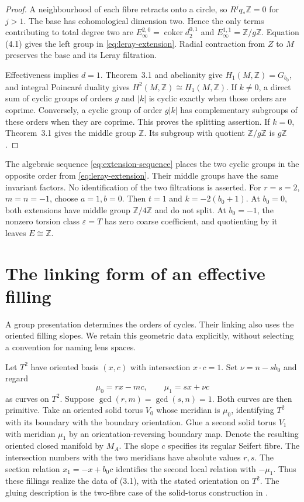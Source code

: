 \begin{proof}
A neighbourhood of each fibre retracts onto a circle, so
$R^jq_*\mathbb Z=0$ for $j>1$.  The base has cohomological dimension
two.  Hence the only terms contributing to total degree two are
$E_\infty^{2,0}=\operatorname{coker}d_2^{0,1}$ and
$E_\infty^{1,1}=\mathbb Z/g\mathbb Z$.  Equation (4.1) gives the
left group in \eqref{eq:leray-extension}.  Radial contraction from $Z$
to $M$ preserves the base and its Leray filtration.

Effectiveness implies $d=1$.  Theorem~3.1 and abelianity give
$H_1(M,\mathbb Z)=G_{b_0}$, and integral Poincar\'e duality gives
$H^2(M,\mathbb Z)\cong H_1(M,\mathbb Z)$.
If $k\ne0$, a direct sum of cyclic groups of orders $g$ and $|k|$ is
cyclic exactly when those orders are coprime.  Conversely, a cyclic group
of order $g|k|$ has complementary subgroups of these orders when they
are coprime.  This proves the splitting assertion.
If $k=0$, Theorem~3.1 gives the middle group $\mathbb Z$.
Its subgroup with quotient $\mathbb Z/g\mathbb Z$ is $g\mathbb Z$.
\end{proof}

The algebraic sequence \eqref{eq:extension-sequence} places the two
cyclic groups in the opposite order from \eqref{eq:leray-extension}.
Their middle groups have the same invariant factors.  No identification
of the two filtrations is asserted.
For $r=s=2$, $m=n=-1$, choose $a=1,b=0$.  Then $t=1$ and
$k=-2(b_0+1)$.  At $b_0=0$, both extensions have middle group
$\mathbb Z/4\mathbb Z$ and do not split.
At $b_0=-1$, the nonzero torsion class $\varepsilon=T$ has zero
coarse coefficient, and quotienting by it leaves $E\cong\mathbb Z$.

\section{The linking form of an effective filling}

A group presentation determines the orders of cycles.  Their linking
also uses the oriented filling slopes.  We retain this geometric data
explicitly, without selecting a convention for naming lens spaces.

Let $T^2$ have oriented basis $(x,c)$ with intersection $x\cdot c=1$.
Set $\nu=n-sb_0$ and regard
\begin{equation}\label{eq:filling-slopes}
       \mu_0=rx-mc,\qquad \mu_1=sx+\nu c
\end{equation}
as curves on $T^2$.  Suppose
$\gcd(r,m)=\gcd(s,n)=1$.  Both curves are then primitive.
Take an oriented solid torus $V_0$ whose meridian is $\mu_0$, identifying
$T^2$ with its boundary with the boundary orientation.
Glue a second solid torus $V_1$ with meridian $\mu_1$ by an
orientation-reversing boundary map.  Denote the resulting oriented
closed manifold by $M_A$.
The slope $c$ specifies its regular Seifert fibre.  The intersection
numbers with the two meridians have absolute values $r,s$.
The section relation $x_1=-x+b_0c$ identifies the second local
relation with $-\mu_1$.  Thus these fillings realize the data of (3.1),
with the stated orientation on $T^2$.
The gluing description is the two-fibre case of the solid-torus
construction in \cite[Section~2.1, pp.~25--27]{Hatcher}.

